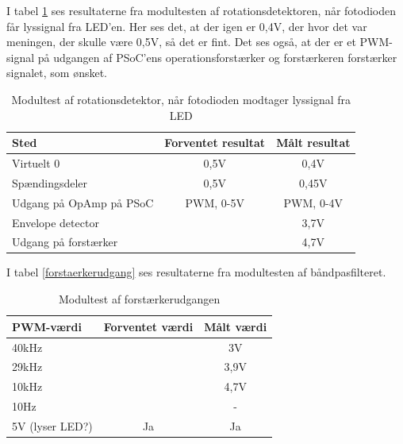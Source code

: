 I tabel \ref{dioderSe} ses resultaterne fra modultesten af rotationsdetektoren, når fotodioden får lyssignal fra LED'en. Her ses det, at der igen er 0,4V, der hvor det var meningen, der skulle være 0,5V, så det er fint. Det ses også, at der er et PWM-signal på udgangen af PSoC'ens operationsforstærker og forstærkeren forstærker signalet, som ønsket. 

\begin{table}[H]
	\centering
	\begin{tabular}{|l|c|c|}
		\hline
		\textbf{Sted}           & \textbf{Forventet resultat} & \textbf{Målt resultat} \\ \hline
		Virtuelt 0              & 0,5V                        & 0,4V                   \\ \hline
		Spændingsdeler          & 0,5V                        & 0,45V                  \\ \hline
		Udgang på OpAmp på PSoC & PWM, 0-5V                   & PWM, 0-4V              \\ \hline
		Envelope detector       & \multicolumn{1}{l|}{}       & 3,7V                   \\ \hline
		Udgang på forstærker    & \multicolumn{1}{l|}{}       & 4,7V                   \\ \hline
	\end{tabular}
	\caption{Modultest af rotationsdetektor, når fotodioden modtager lyssignal fra LED}
	\label{dioderSe}
\end{table}

I tabel \ref{forstaerkerudgang} ses resultaterne fra modultesten af båndpasfilteret. 

\begin{table}[H]
	\centering
	\begin{tabular}{|l|c|c|}
		\hline
		\textbf{PWM-værdi} & \textbf{Forventet værdi} & \textbf{Målt værdi} \\ \hline
		40kHz              & \multicolumn{1}{l|}{}    & 3V                  \\ \hline
		29kHz              & \multicolumn{1}{l|}{}    & 3,9V                \\ \hline
		10kHz              & \multicolumn{1}{l|}{}    & 4,7V                \\ \hline
		10Hz               & \multicolumn{1}{l|}{}    & -                   \\ \hline
		5V (lyser LED?)    & Ja                       & Ja                  \\ \hline
	\end{tabular}
	\caption{Modultest af forstærkerudgangen}
	\label{table:forstaerkerudgang}
\end{table}

